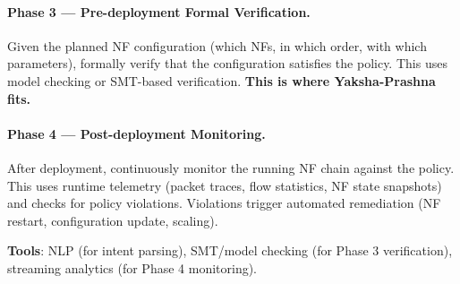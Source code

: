 \paragraph{Phase 3 --- Pre-deployment Formal Verification.}
Given the planned NF configuration (which NFs, in which order, with which parameters), formally verify that the configuration satisfies the policy. This uses model checking or SMT-based verification. \textbf{This is where Yaksha-Prashna fits.}

\paragraph{Phase 4 --- Post-deployment Monitoring.}
After deployment, continuously monitor the running NF chain against the policy. This uses runtime telemetry (packet traces, flow statistics, NF state snapshots) and checks for policy violations. Violations trigger automated remediation (NF restart, configuration update, scaling).

\textbf{Tools}: NLP (for intent parsing), SMT/model checking (for Phase 3 verification), streaming analytics (for Phase 4 monitoring).

